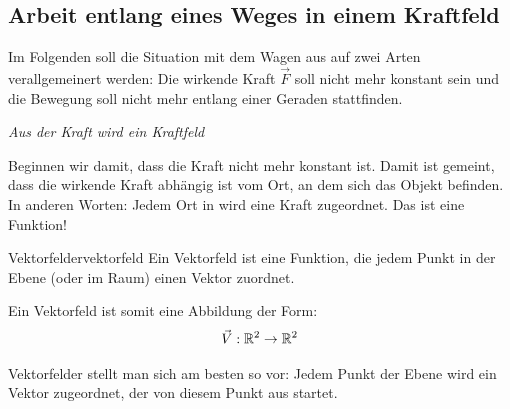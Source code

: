 \clearpage






\subsection{Arbeit entlang eines Weges in einem Kraftfeld}
Im Folgenden soll die Situation mit dem Wagen aus  auf zwei Arten verallgemeinert werden: Die wirkende Kraft $\vec{F}$  soll nicht mehr konstant sein und die Bewegung soll nicht mehr entlang einer Geraden stattfinden.

\emph{Aus der Kraft wird ein Kraftfeld}

Beginnen wir damit, dass die Kraft nicht mehr konstant ist. Damit ist gemeint, dass die wirkende Kraft abhängig ist vom Ort, an dem sich das Objekt befinden. In anderen Worten: Jedem Ort in wird eine Kraft zugeordnet. Das ist eine Funktion!
\begin{definition}
    {Vektorfelder}{vektorfeld}
    Ein Vektorfeld ist eine Funktion, die jedem Punkt in der Ebene (oder im Raum) einen Vektor zuordnet.

    Ein Vektorfeld ist somit eine Abbildung der Form:
    $$ \vec{V} : \mathbb{R}^2 \to \mathbb{R}^2$$
\end{definition}
Vektorfelder stellt man sich am besten so vor: Jedem Punkt der Ebene wird ein Vektor zugeordnet, der von diesem Punkt aus startet.

